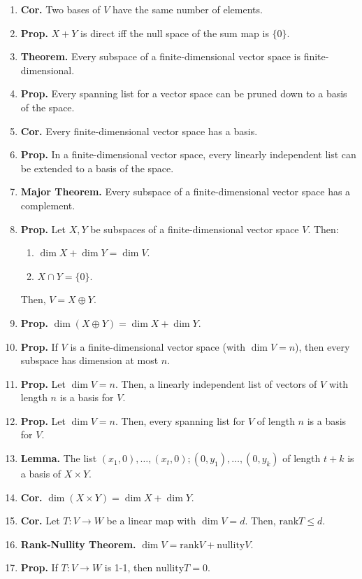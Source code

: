 \begin{enumerate}
	\item \textbf{Cor. } Two bases of $V$ have the same number of elements. 
	\item \textbf{Prop. } $X+Y$ is direct iff the null space of the sum map is $\{0\}$. 
	\item \textbf{Theorem. } Every subspace of a finite-dimensional vector space is finite-dimensional. 
	\item \textbf{Prop. } Every spanning list for a vector space can be pruned down to a basis of the space. 
	\item \textbf{Cor. } Every finite-dimensional vector space has a basis. 
	\item \textbf{Prop. } In a finite-dimensional vector space, every linearly independent list can be extended to a basis of the space. 
	\item \textbf{Major Theorem. } Every subspace of a finite-dimensional vector space has a complement. 
	\item \textbf{Prop. } Let $X,Y$ be subspaces of a finite-dimensional vector space $V$. Then: 
	\begin{enumerate}
		\item $\dim X + \dim Y = \dim V$. 
		\item $X \cap Y = \{0\}$. 
	\end{enumerate}
	Then, $V=X \oplus Y$. 
	\item \textbf{Prop. } $\dim(X \oplus Y) = \dim X + \dim Y$. 
	\item \textbf{Prop. } If $V$ is a finite-dimensional vector space (with $\dim V = n$), then every subspace has dimension at most $n$. 
	\item \textbf{Prop. } Let $\dim V = n$. Then, a linearly independent list of vectors of $V$ with length $n$ is a basis for $V$. 
	\item \textbf{Prop. } Let $\dim V = n$. Then, every spanning list for $V$ of length $n$ is a basis for $V$.
	\item \textbf{Lemma. } The list $(x_1,0),\dots,(x_t,0);(0,y_1),\dots,(0,y_k)$ of length $t+k$ is a basis of $X \times Y$. 
	\item \textbf{Cor. } $\dim (X \times Y) = \dim X + \dim Y$. 
	\item \textbf{Cor. } Let $T: V \to W$ be a linear map with $\dim V = d$. Then, $\textrm{rank}T \leq d$. 
	\item \textbf{Rank-Nullity Theorem. } $\dim V = \textrm{rank}V + \textrm{nullity}V$. 
	\item \textbf{Prop. } If $T: V \to W$ is 1-1, then $\textrm{nullity}T = 0$. 

\end{enumerate}
